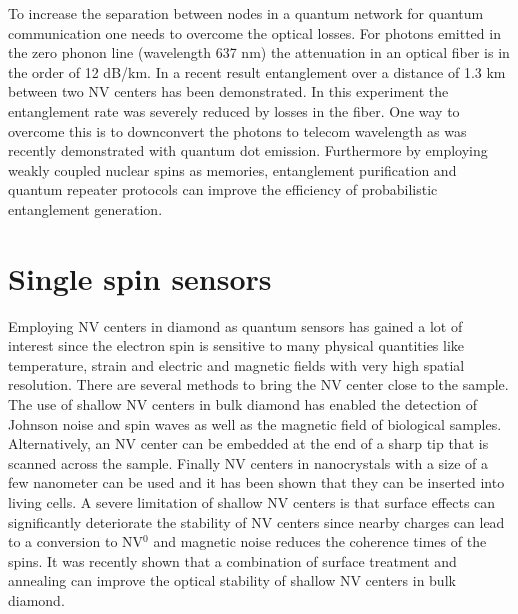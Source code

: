 To increase the separation between nodes in a quantum network for quantum communication one needs to overcome the optical losses. For photons emitted in the zero phonon line (wavelength 637 nm) the attenuation in an optical fiber is in the order of 12 dB/km. In a recent result entanglement over a distance of 1.3 km between two NV centers has been demonstrated\cite{Hensen_arXiv_2015}. In this experiment the entanglement rate was severely reduced by losses in the fiber. One way to overcome this is to downconvert the photons to telecom wavelength as was recently demonstrated with quantum dot emission\cite{DeGreve_Nature_2012,Zaske_Phys.Rev.Lett._2012}. Furthermore by employing weakly coupled nuclear spins as memories, entanglement purification\cite{Campbell_Phys.Rev.Lett._2008} and quantum repeater protocols\cite{Briegel_Phys.Rev.Lett._1998} can improve the efficiency of probabilistic entanglement generation.

\section{Single spin sensors}
Employing NV centers in diamond as quantum sensors \cite{Taylor_NatPhys_2008,Schirhagl__2014} has gained a lot of interest since the electron spin is sensitive to many physical quantities like temperature\cite{Acosta_Phys.Rev.Lett._2010,Toyli_PNAS_2013}, strain\cite{Ovartchaiyapong_NatCommun_2014} and electric and magnetic fields\cite{Taylor_NatPhys_2008,Dolde_NatPhys_2011} with very high spatial resolution. There are several methods to bring the NV center close to the sample. The use of shallow NV centers in bulk diamond has enabled the detection of Johnson noise\cite{Kolkowitz_Science_2015} and spin waves\cite{vanderSar_NatCommun_2015} as well as the magnetic field of biological samples\cite{LeSage_Nature_2013}. Alternatively, an NV center can be embedded at the end of a sharp tip that is scanned across the sample\cite{Balasubramanian_Nature_2008,Maletinsky_NatNano_2012,Rondin__2012,Pelliccione_Phys.Rev.Applied_2014,Haberle_NatNano_2015}. Finally NV centers in  nanocrystals with a size of a few nanometer can be used and it has been shown that they can be inserted into living cells\cite{Kucsko_Nature_2013}. A severe limitation of shallow NV centers is that surface effects can significantly deteriorate the stability of NV centers since nearby charges can lead to a conversion to NV$^0$ and magnetic noise reduces the coherence times of the spins. It was recently shown that a combination of surface treatment and annealing can improve the optical stability of shallow NV centers in bulk diamond\cite{Chu_NanoLett._2014}.

